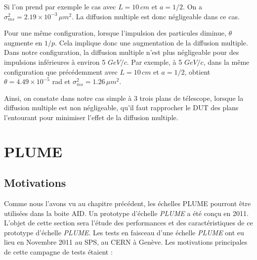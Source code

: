  \medskip
  
  Si l'on prend par exemple le cas avec $L=10 \, cm$ et $a=1/2$. On a $\sigma_{ms}^2 = 2.19 \times 10^{-3} \, \mu m^2$. La diffusion multiple est donc n\'egligeable dans ce cas. 
  
  \medskip
  
  Pour une m\^eme configuration, lorsque l'impulsion des particules diminue, $\theta$ augmente en $1/p$. Cela implique donc une augmentation de la diffusion multiple. Dans notre configuration, la diffusion multiple n'est plus n\'egligeable pour des impulsions inf\'erieures \`a environ 5 $GeV/c$. Par exemple, \`a 5 $GeV/c$, dans la m\^eme configuration que pr\'ec\'edemment avec $L=10 \, cm$ et $a=1/2$, obtient $\theta = 4.49 \times 10^{-5}$ rad et $\sigma_{ms}^2 = 1.26 \, \mu m^2$.
  
  \medskip

  Ainsi, on constate dans notre cas simple \`a 3 trois plans de t\'elescope, lorsque la diffusion multiple est non n\'egligeable, qu'il faut rapprocher le DUT des plans l'entourant pour minimiser l'effet de la diffusion multiple.
  
  

\section{PLUME}

  \subsection{Motivations}

  Comme nous l'avons vu au chapitre pr\'ec\'edent, les \'echelles PLUME pourront être utilisées dans la boite AID. Un prototype d'\'echelle \textit{PLUME} a \'et\'e con\c{c}u en 2011. L'objet de cette section sera l'étude des performances et des caract\'eristiques de ce prototype d'\'echelle \textit{PLUME}. Les tests en faisceau d'une \'echelle \textit{PLUME} ont eu lieu en Novembre 2011 au SPS, au CERN \`a Gen\`eve. Les motivations principales de cette campagne de tests étaient :  
  
